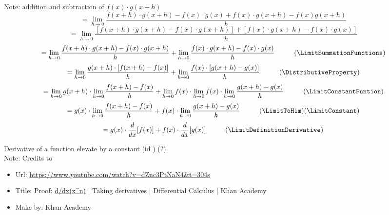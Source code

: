 \documentclass{book}
\begin{document}
                    Note: addition and subtraction of $f(x) \cdot g(x + h)$
                    \[= \lim_{h \rightarrow 0} \frac{f(x + h) \cdot g(x + h) - f(x) \cdot g(x) + f(x) \cdot g(x + h) - f(x) g(x + h)}{h}\]
                    \[= \lim_{h \rightarrow 0} \frac{[f(x + h) \cdot g(x + h) - f(x) \cdot g(x + h)] + [f(x) \cdot g(x + h) - f(x) \cdot g(x)]}{h}\]
                    \[= \lim_{h \rightarrow 0} \frac{f(x + h) \cdot g(x + h) - f(x) \cdot g(x + h)}{h} + \lim_{h \rightarrow 0} \frac{f(x) \cdot g(x + h) - f(x) \cdot g(x)}{h} \hspace{1cm} (\LimitSummationFunctions)\]
                    \[= \lim_{h \rightarrow 0} \frac{g(x + h) \cdot [f(x + h) - f(x)]}{h} + \lim_{h \rightarrow 0} \frac{f(x) \cdot [g(x + h) - g(x)]}{h} \hspace{1cm} (\DistributiveProperty)\]
                    \[= \lim_{h \rightarrow 0} g(x + h) \cdot \lim_{h \rightarrow 0}\frac{f(x + h) - f(x)}{h} + \lim_{h \rightarrow 0} f(x) \cdot \lim_{h \rightarrow 0} f(x) \cdot \lim_{h \rightarrow 0} \frac{g(x + h) - g(x)}{h} \hspace{1cm} (\LimitConstantFuntion)\]
                    \[= g(x) \cdot \lim_{h \rightarrow 0} \frac{f(x + h) - f(x)}{h} + f(x) \cdot \lim_{h \rightarrow 0} \frac{g(x + h) - g(x)}{h} \hspace{1cm} (\LimitToHim) (\LimitConstant)\]
                    \[= g(x) \cdot \frac{d}{dx} [f(x)] + f(x) \cdot \frac{d}{dx} [g(x)] \hspace{1cm} (\LimitDefinitionDerivative)\]                    

                    Derivative of a function elevate by a constant (id \DerivativeFunctionElevateConstant) (?) \\

                    Note: Credits to
                    \begin{itemize}
                        \item Url: \url{https://www.youtube.com/watch?v=dZnc3PtNaN4&t=304s}
                        \item Title: Proof: \url{d/dx(x^n)} \url{|} Taking derivatives \url{|} Differential Calculus \url{|} Khan Academy
                        \item Make by: Khan Academy
                    \end{itemize}
                    
\end{document}
